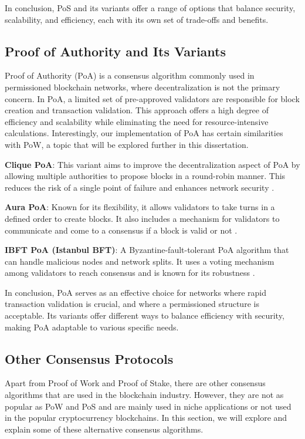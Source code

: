 In conclusion, PoS and its variants offer a range of options that balance security, scalability, and efficiency, each with its own set of trade-offs and benefits.

\subsection*{\textbf{Proof of Authority and Its Variants}}
Proof of Authority (PoA) is a consensus algorithm commonly used in permissioned blockchain networks, where decentralization is not the primary concern. In PoA, a limited set of pre-approved validators are responsible for block creation and transaction validation. This approach offers a high degree of efficiency and scalability while eliminating the need for resource-intensive calculations. Interestingly, our implementation of PoA has certain similarities with PoW, a topic that will be explored further in this dissertation.

\textbf{Clique PoA}: This variant aims to improve the decentralization aspect of PoA by allowing multiple authorities to propose blocks in a round-robin manner. This reduces the risk of a single point of failure and enhances network security \cite{szilagyi2017clique}.

\textbf{Aura PoA}: Known for its flexibility, it allows validators to take turns in a defined order to create blocks. It also includes a mechanism for validators to communicate and come to a consensus if a block is valid or not \cite{aura_poa}.

\textbf{IBFT PoA (Istanbul BFT)}: A Byzantine-fault-tolerant PoA algorithm that can handle malicious nodes and network splits. It uses a voting mechanism among validators to reach consensus and is known for its robustness \cite{moniz2020istanbul}.

In conclusion, PoA serves as an effective choice for networks where rapid transaction validation is crucial, and where a permissioned structure is acceptable. Its variants offer different ways to balance efficiency with security, making PoA adaptable to various specific needs.


\subsection*{\textbf{Other Consensus Protocols}}

Apart from Proof of Work and Proof of Stake, there are other consensus algorithms that are used in the blockchain industry. However, they are not as popular as PoW and PoS and are mainly used in niche applications or not used in the popular cryptocurrency blockchains. In this section, we will explore and explain some of these alternative consensus algorithms.

